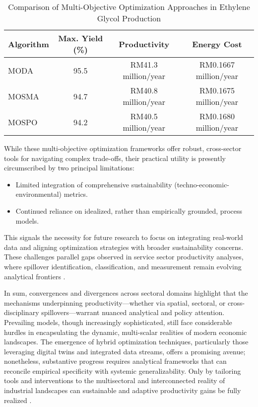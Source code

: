 \documentclass[11pt]{article}
\begin{document}
\begin{table}[ht]
    \centering
    \caption{Comparison of Multi-Objective Optimization Approaches in Ethylene Glycol Production}
    \label{tab:ethylene_glycol_optimization}
    \begin{tabular}{lccc}
        \toprule
        \textbf{Algorithm} & \textbf{Max. Yield (\%)} & \textbf{Productivity} & \textbf{Energy Cost} \\
        \midrule
        MODA  & 95.5 & RM41.3 million/year & RM0.1667 million/year \\
        MOSMA & 94.7 & RM40.8 million/year & RM0.1675 million/year \\
        MOSPO & 94.2 & RM40.5 million/year & RM0.1680 million/year \\
        \bottomrule
    \end{tabular}
\end{table}

While these multi-objective optimization frameworks offer robust, cross-sector tools for navigating complex trade-offs, their practical utility is presently circumscribed by two principal limitations:
\begin{itemize}
    \item Limited integration of comprehensive sustainability (techno-economic-environmental) metrics.
    \item Continued reliance on idealized, rather than empirically grounded, process models.
\end{itemize}
This signals the necessity for future research to focus on integrating real-world data and aligning optimization strategies with broader sustainability concerns. These challenges parallel gaps observed in service sector productivity analyses, where spillover identification, classification, and measurement remain evolving analytical frontiers \cite{ref75}.

In sum, convergences and divergences across sectoral domains highlight that the mechanisms underpinning productivity—whether via spatial, sectoral, or cross-disciplinary spillovers—warrant nuanced analytical and policy attention. Prevailing models, though increasingly sophisticated, still face considerable hurdles in encapsulating the dynamic, multi-scalar realities of modern economic landscapes. The emergence of hybrid optimization techniques, particularly those leveraging digital twins and integrated data streams, offers a promising avenue; nonetheless, substantive progress requires analytical frameworks that can reconcile empirical specificity with systemic generalizability. Only by tailoring tools and interventions to the multisectoral and interconnected reality of industrial landscapes can sustainable and adaptive productivity gains be fully realized \cite{ref74}\cite{ref75}\cite{ref88}.
\end{document}
